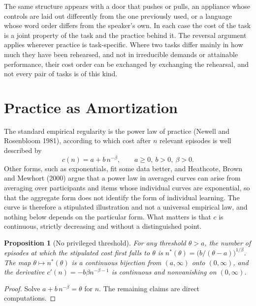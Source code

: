 \documentclass[11pt]{article}
\newtheorem{proposition}{Proposition}
\theoremstyle{definition}
\begin{document}
The same structure appears with a door that pushes or pulls, an appliance whose controls are laid out differently from the one previously used, or a language whose word order differs from the speaker's own. In each case the cost of the task is a joint property of the task and the practice behind it. The reversal argument applies wherever practice is task-specific. Where two tasks differ mainly in how much they have been rehearsed, and not in irreducible demands or attainable performance, their cost order can be exchanged by exchanging the rehearsal, and not every pair of tasks is of this kind.

\section{Practice as Amortization}

The standard empirical regularity is the power law of practice (Newell and Rosenbloom 1981), according to which cost after $n$ relevant episodes is well described by
\begin{equation}
c(n)=a+b\,n^{-\beta},\qquad a\ge 0,\ b>0,\ \beta>0 .\label{eq:power}
\end{equation}
Other forms, such as exponentials, fit some data better, and Heathcote, Brown and Mewhort (2000) argue that a power law in averaged curves can arise from averaging over participants and items whose individual curves are exponential, so that the aggregate form does not identify the form of individual learning. The curve is therefore a stipulated illustration and not a universal empirical law, and nothing below depends on the particular form. What matters is that $c$ is continuous, strictly decreasing and without a distinguished point.

\begin{proposition}[No privileged threshold]
For any threshold $\theta>a$, the number of episodes at which the stipulated cost first falls to $\theta$ is $n^*(\theta)=\bigl(b/(\theta-a)\bigr)^{1/\beta}$. The map $\theta\mapsto n^*(\theta)$ is a continuous bijection from $(a,\infty)$ onto $(0,\infty)$, and the derivative $c'(n)=-b\beta n^{-\beta-1}$ is continuous and nonvanishing on $(0,\infty)$.
\end{proposition}

\begin{proof}
Solve $a+b\,n^{-\beta}=\theta$ for $n$. The remaining claims are direct computations.
\end{proof}
\end{document}
